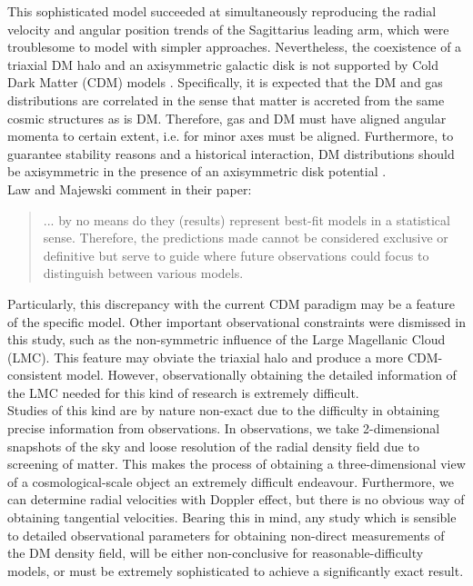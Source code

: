 This sophisticated model succeeded at simultaneously reproducing the radial velocity and angular position trends of the Sagittarius leading arm, which were troublesome to model with simpler approaches. 
Nevertheless, the coexistence of a triaxial DM halo and an axisymmetric galactic disk is not supported by Cold Dark Matter (CDM) models \cite{Debattista_et_al._2008}. 
Specifically, it is expected that the DM and gas distributions are correlated in the sense that matter is accreted from the same cosmic structures as is DM. 
Therefore, gas and DM must have aligned angular momenta to certain extent, i.e. for minor axes must be aligned. 
Furthermore, to guarantee stability reasons and a historical interaction, DM distributions should be axisymmetric in the presence of an axisymmetric disk potential \cite{Ostriker_and_Peebles_1973}.\\

Law and Majewski comment in their paper: 

\blockquote{... by no means do they (results) represent best-fit models in a statistical sense. Therefore, the predictions made cannot be considered exclusive or definitive but serve to guide where future observations could focus to distinguish between various models.}
 
Particularly, this discrepancy with the current CDM paradigm may be a feature of the specific model. 
Other important observational constraints were dismissed in this study, such as the non-symmetric influence of the Large Magellanic Cloud (LMC). 
This feature may obviate the triaxial halo and produce a more CDM-consistent model. 
However, observationally obtaining the detailed information of the LMC needed for this kind of research is extremely difficult.\\

Studies of this kind are by nature non-exact due to the difficulty in obtaining precise information from observations. 
In observations, we take 2-dimensional snapshots of the sky and loose resolution of the radial density field due to screening of matter. 
This makes the process of obtaining  a three-dimensional view of a cosmological-scale object an extremely difficult endeavour. 
Furthermore, we can determine radial velocities with Doppler effect, but there is no obvious way of obtaining tangential velocities. 
Bearing this in mind, any study which is sensible to detailed observational parameters for obtaining non-direct measurements of the DM density field, will be either non-conclusive for reasonable-difficulty models, or must be extremely sophisticated to achieve a significantly exact result.\\

